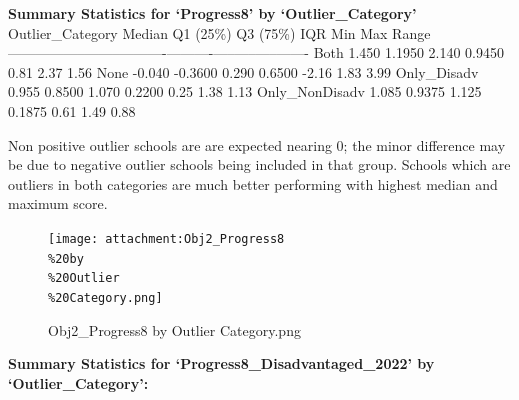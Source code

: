 \documentclass[
  letterpaper,
  DIV=11,
  numbers=noendperiod]{scrartcl}
\begin{document}
\textbf{Summary Statistics for `Progress8' by `Outlier\_Category'}
\textbar{} Outlier\_Category \textbar{} Median \textbar{} Q1 (25\%)
\textbar{} Q3 (75\%) \textbar{} IQR \textbar{} Min \textbar{} Max
\textbar{} Range \textbar{}
\textbar-----------------\textbar--------\textbar----------\textbar----------\textbar-----\textbar-----\textbar-----\textbar-------\textbar{}
\textbar{} Both \textbar{} 1.450 \textbar{} 1.1950 \textbar{} 2.140
\textbar{} 0.9450 \textbar{} 0.81 \textbar{} 2.37 \textbar{} 1.56
\textbar{} \textbar{} None \textbar{} -0.040 \textbar{} -0.3600
\textbar{} 0.290 \textbar{} 0.6500 \textbar{} -2.16 \textbar{} 1.83
\textbar{} 3.99 \textbar{} \textbar{} Only\_Disadv \textbar{} 0.955
\textbar{} 0.8500 \textbar{} 1.070 \textbar{} 0.2200 \textbar{} 0.25
\textbar{} 1.38 \textbar{} 1.13 \textbar{} \textbar{} Only\_NonDisadv
\textbar{} 1.085 \textbar{} 0.9375 \textbar{} 1.125 \textbar{} 0.1875
\textbar{} 0.61 \textbar{} 1.49 \textbar{} 0.88 \textbar{}

Non positive outlier schools are are expected nearing 0; the minor
difference may be due to negative outlier schools being included in that
group. Schools which are outliers in both categories are much better
performing with highest median and maximum score.

\begin{figure}[H]

{\centering \texttt{[image: attachment:Obj2\_Progress8\\\%20by\\\%20Outlier\\\%20Category.png]}

}

\caption{Obj2\_Progress8 by Outlier Category.png}

\end{figure}%

\textbf{Summary Statistics for `Progress8\_Disadvantaged\_2022' by
`Outlier\_Category':}
\end{document}
